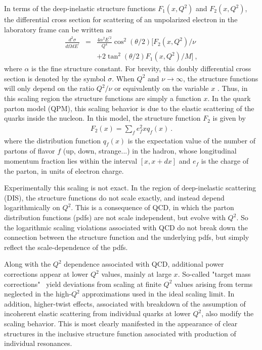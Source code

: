In terms of the deep-inelastic structure functions $F_1(x,Q^2)$
and $F_2(x,Q^2)$, the differential cross section for scattering of an
unpolarized electron in the laboratory frame can be written as
%
\begin{eqnarray} \nonumber \label{xsec_eqn}
\frac{d^2\sigma}{d\Omega dE^{'}} &=& \frac{4\alpha^2E^{'2}}{Q^4} \cos^2(\theta/2) \big[ F_2(x,Q^2)/\nu \\
&&+ 2\tan^2(\theta/2) F_1(x,Q^2)/M \big] ~,
\end{eqnarray}
%
where $\alpha$ is the fine structure constant. For
brevity, this doubly differential cross section is denoted by the symbol
$\sigma$. When $Q^2$ and $\nu \rightarrow \infty$, the structure functions
will only depend on the ratio $Q^2/\nu$ or equivalently on the variable $x$
\cite{bjorken_scaling}. Thus, in this scaling region the structure functions
are simply a function $x$. In the quark parton model (QPM), this scaling
behavior is due to the elastic scattering of the quarks inside the nucleon. In
this model, the structure function $F_2$ is given by
%
\begin{eqnarray} \label{qpmf2_eqn}
 F_2(x)= \sum_f e_f^2 x q_f(x) ~.
\end{eqnarray}
%
where the distribution function $q_f(x)$ is the expectation value of the
number of partons of flavor $f$ (up, down, strange...) in the hadron, whose
longitudinal momentum fraction lies within the interval $[x, x+dx]$ and $e_f$
is the charge of the parton, in units of electron charge.

Experimentally this scaling is not exact.  In the region of deep-inelastic
scattering (DIS), the structure functions do not scale exactly, and instead
depend logarithmically on $Q^2$.  This is a consequence of QCD, in which the
parton distribution functions (pdfs) are not scale independent, but evolve
with $Q^2$.  So the logarithmic scaling violations associated with QCD
do not break down the connection between the structure function and the
underlying pdfs, but simply reflect the scale-dependence of the pdfs.

Along with the $Q^2$ dependence associated with QCD, additional power
corrections appear at lower $Q^2$ values, mainly at large $x$.  So-called
"target mass corrections"~\cite{Schienbein_tarmass_rev} yield deviations from
scaling at finite $Q^2$ values arising from terms neglected in the high-$Q^2$
approximations used in the ideal scaling limit.  In addition, higher-twist
effects, associated with breakdown of the assumption of incoherent elastic
scattering from individual quarks at lower $Q^2$, also modify the scaling
behavior.  This is most clearly manifested in the appearance of clear
structures in the inclusive structure function associated with production of
individual resonances.

